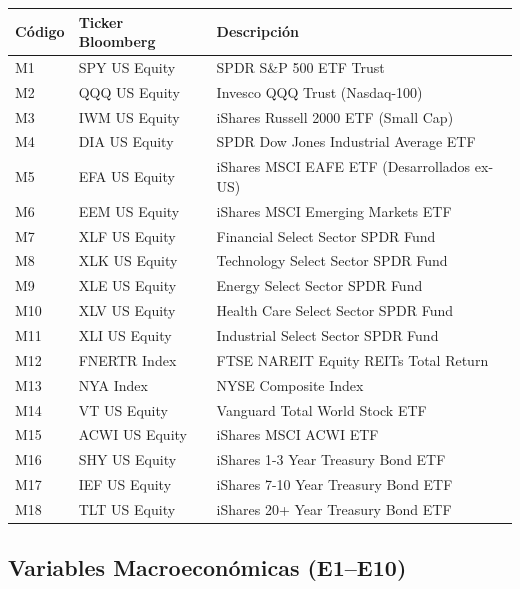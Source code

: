 \documentclass[11pt,a4paper]{article}
\begin{document}
\small
\begin{longtable}{lp{3.5cm}p{7.5cm}}
\toprule
\textbf{Código} & \textbf{Ticker Bloomberg} & \textbf{Descripción} \\
\midrule
\endhead
M1 & SPY US Equity & SPDR S\&P 500 ETF Trust \\
M2 & QQQ US Equity & Invesco QQQ Trust (Nasdaq-100) \\
M3 & IWM US Equity & iShares Russell 2000 ETF (Small Cap) \\
M4 & DIA US Equity & SPDR Dow Jones Industrial Average ETF \\
M5 & EFA US Equity & iShares MSCI EAFE ETF (Desarrollados ex-US) \\
M6 & EEM US Equity & iShares MSCI Emerging Markets ETF \\
M7 & XLF US Equity & Financial Select Sector SPDR Fund \\
M8 & XLK US Equity & Technology Select Sector SPDR Fund \\
M9 & XLE US Equity & Energy Select Sector SPDR Fund \\
M10 & XLV US Equity & Health Care Select Sector SPDR Fund \\
M11 & XLI US Equity & Industrial Select Sector SPDR Fund \\
M12 & FNERTR Index & FTSE NAREIT Equity REITs Total Return \\
M13 & NYA Index & NYSE Composite Index \\
M14 & VT US Equity & Vanguard Total World Stock ETF \\
M15 & ACWI US Equity & iShares MSCI ACWI ETF \\
M16 & SHY US Equity & iShares 1-3 Year Treasury Bond ETF \\
M17 & IEF US Equity & iShares 7-10 Year Treasury Bond ETF \\
M18 & TLT US Equity & iShares 20+ Year Treasury Bond ETF \\
\bottomrule
\end{longtable}
\normalsize

\subsection{Variables Macroeconómicas (E1--E10)}
\end{document}
